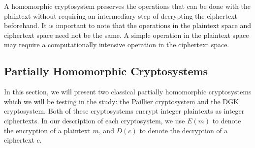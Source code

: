 
A homomorphic cryptosystem preserves the operations that can be done with the plaintext without requiring an intermediary step of decrypting the ciphertext beforehand. It is important to note that the operations in the plaintext space and ciphertext space need not be the same. A simple operation in the plaintext space may require a computationally intensive operation in the ciphertext space.


\subsection{Partially Homomorphic Cryptosystems}
In this section, we will present two classical partially homomorphic cryptosystems which we will be testing in the study: the Paillier cryptosystem and the DGK cryptosystem. Both of these cryptosystems encrypt integer plaintexts as integer ciphertexts. In our description of each cryptosystem, we use $E(m)$ to denote the encryption of a plaintext $m$, and $D(c)$ to denote the decryption of a ciphertext $c$.

